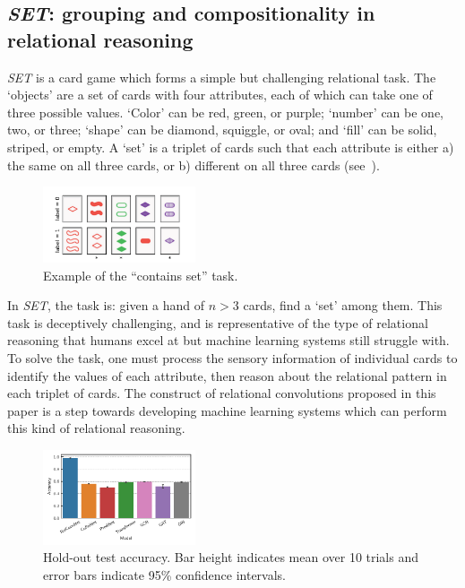 \subsection{\textit{SET}: grouping and compositionality in relational reasoning}\label{ssec:experiments_set}

\textit{SET} is a card game which forms a simple but challenging relational task. The `objects' are a set of cards with four attributes, each of which can take one of three possible values. `Color' can be red, green, or purple; `number' can be one, two, or three; `shape' can be diamond, squiggle, or oval; and `fill' can be solid, striped, or empty. A `set' is a triplet of cards such that each attribute is either a) the same on all three cards, or b) different on all three cards (see~).

\begin{figure}[ht]
    \centering
    \includegraphics[width=0.4\textwidth]{figs/contains_set_example.pdf}
    \vskip-12pt
    \caption{Example of the ``contains set'' task.}\label{fig:contains_set_example}
    \vskip-7pt
\end{figure}

In \textit{SET}, the task is: given a hand of $n > 3$ cards, find a `set' among them. 
This task is deceptively challenging, and is representative of the type of relational reasoning that humans excel at but machine learning systems still struggle with. To solve the task, one must process the sensory information of individual cards to identify the values of each attribute, then reason about the relational pattern in each triplet of cards.
The construct of relational convolutions proposed in this paper is a step towards developing machine learning systems which can perform this kind of relational reasoning.

\begin{figure}[ht]
    \centering
    \includegraphics[width=0.4\textwidth]{figs/experiments/contains_set_acc.pdf}
    \vskip-12pt
    \caption{Hold-out test accuracy. Bar height indicates mean over 10 trials and error bars indicate 95\% confidence intervals.}\label{fig:contains_set_acc}
    \vskip-10pt
\end{figure}

